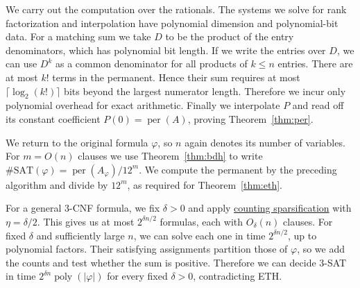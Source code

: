 \documentclass{article}
\theoremstyle{definition}
\DeclareMathOperator{\per}{per}
\begin{document}
We carry out the computation over the rationals. The systems we solve
for rank factorization and interpolation have polynomial dimension and
polynomial-bit data. For a matching sum we take \(D\) to be the product
of the entry denominators, which has polynomial bit length. If we write
the entries over \(D\), we can use \(D^k\) as a common denominator for
all products of \(k\le n\) entries. There are at most \(k!\) terms in the
permanent. Hence their sum requires at most
\(\lceil\log_2(k!)\rceil\) bits beyond the largest numerator length.
Therefore we incur only polynomial overhead for exact arithmetic.
Finally we interpolate \(P\) and read off its constant coefficient
\(P(0)=\per(A)\), proving Theorem~\ref{thm:per}.

We return to the original formula \(\varphi\), so \(n\) again denotes
its number of variables. For \(m=O(n)\) clauses we use Theorem~\ref{thm:bdh}
to write \(\#\mathrm{SAT}(\varphi)=\per(A_\varphi)/12^m\). We compute
the permanent by the preceding algorithm and divide by \(12^m\),
as required for Theorem~\ref{thm:eth}.

For a general 3-CNF formula, we fix \(\delta>0\) and apply
\hyperref[lem:sparsify]{counting sparsification} with \(\eta=\delta/2\).
This gives us at most \(2^{\delta n/2}\) formulas, each with \(O_\delta(n)\)
clauses. For fixed \(\delta\) and sufficiently large \(n\), we can solve
each one in time \(2^{\delta n/2}\), up to polynomial factors. Their
satisfying assignments partition those of \(\varphi\), so we add the
counts and test whether the sum is positive. Therefore we can decide 3-SAT in time
\(2^{\delta n}\operatorname{poly}(|\varphi|)\) for every fixed
\(\delta>0\), contradicting ETH.
\end{document}
